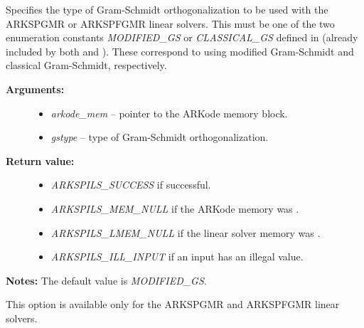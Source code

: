 \documentclass[letterpaper,10pt,english]{sphinxmanual}
\begin{document}

\begin{fulllineitems}
\label{c_interface/User_callable:ARKSpilsSetGSType}
Specifies the type of Gram-Schmidt orthogonalization to
be used with the ARKSPGMR or ARKSPFGMR linear solvers. This must be
one of the two enumeration constants \emph{MODIFIED\_GS} or \emph{CLASSICAL\_GS}
defined in  (already included by both
 and ). These correspond to
using modified Gram-Schmidt and classical Gram-Schmidt, respectively.
\begin{description}
\item[{\textbf{Arguments:}}] \leavevmode\begin{itemize}
\item {} 
\emph{arkode\_mem} -- pointer to the ARKode memory block.

\item {} 
\emph{gstype} -- type of Gram-Schmidt orthogonalization.

\end{itemize}

\item[{\textbf{Return value:}}] \leavevmode\begin{itemize}
\item {} 
\emph{ARKSPILS\_SUCCESS} if successful.

\item {} 
\emph{ARKSPILS\_MEM\_NULL} if the ARKode memory was .

\item {} 
\emph{ARKSPILS\_LMEM\_NULL} if the linear solver memory was .

\item {} 
\emph{ARKSPILS\_ILL\_INPUT} if an input has an illegal value.

\end{itemize}

\end{description}

\textbf{Notes:} The default value is \emph{MODIFIED\_GS}.

This option is available only for the ARKSPGMR and ARKSPFGMR linear
solvers.

\end{fulllineitems}

\end{document}
